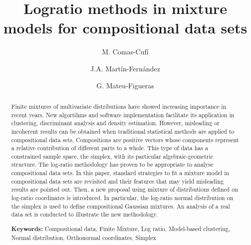 \documentclass[10pt, a4paper]{article}
\title{Logratio methods in mixture models for compositional data sets}
\author{M. Comas-Cufí \and J.A. Martín-Fernández \and G. Mateu-Figueras}
\begin{document}
\maketitle




\begin{abstract}
Finite mixtures of multivariate distributions have showed increasing importance in recent years. New algortihms and software implementation facilitate its application in clustering, discriminant analysis and density estimation. 
However, misleading or incoherent results can be obtained when traditional statistical methods are applied to compositional data sets.
Compositions are positive vectors whose components represent a relative contribution of different parts to a whole.  This type of data has a
constrained sample space, the simplex, with its particular algebraic-geometric structure. The log-ratio methodology has proven to be appropriate to analyse compositional data sets. In this paper, standard strategies to fit a mixture model in compositional data sets are revisited and their features that may yield misleading results are pointed out. Then, a new proposal using mixture of distributions defined on log-ratio coordinates is introduced. In particular, the log-ratio normal distribution on the simplex is used to define compositional Gaussian mixtures.  An analysis of a real data set is conducted to illustrate the new methodology.

{\bf Keywords:} Compositional data, Finite Mixture, Log ratio, Model-based clustering, Normal distribution, Orthonormal coordinates, Simplex
\end{abstract}



\end{document}
